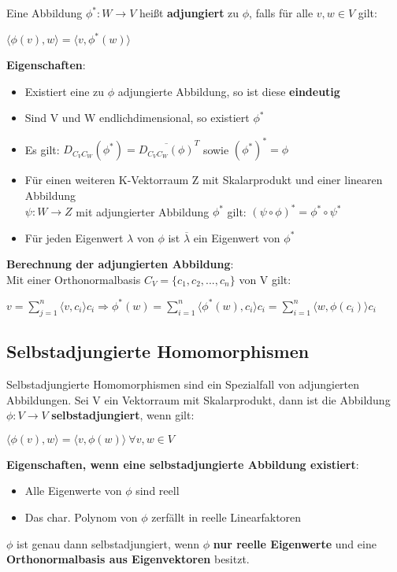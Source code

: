 \documentclass[10pt,a4paper]{article}
\begin{document}
	Eine Abbildung $\phi^*: W \rightarrow V$ heißt \textbf{adjungiert} zu $\phi$, falls für alle $v, w \in V$ gilt:
	\begin{center}
		$\langle \phi(v), w\rangle = \langle v, \phi^*(w)\rangle$
	\end{center}
	\textbf{Eigenschaften}:
	\begin{itemize}
		\item Existiert eine zu $\phi$ adjungierte Abbildung, so ist diese \textbf{eindeutig}
		\item Sind V und W endlichdimensional, so existiert $\phi^*$
		\item Es gilt: $D_{C_VC_W}(\phi^*) = \overline{D_{C_VC_W}(\phi)}^T$ sowie $(\phi^*)^* = \phi$
		\item Für einen weiteren K-Vektorraum Z mit Skalarprodukt und einer linearen Abbildung\\ $\psi: W \rightarrow Z$ mit adjungierter Abbildung $\phi^*$ gilt: $(\psi \circ \phi)^* = \phi^* \circ \psi^*$
		\item Für jeden Eigenwert $\lambda$ von $\phi$ ist $\overline{\lambda}$ ein Eigenwert von $\phi^*$
	\end{itemize}
	\textbf{Berechnung der adjungierten Abbildung}:\\
	Mit einer Orthonormalbasis $C_V = \{c_1, c_2, ..., c_n\}$ von V gilt:
	\begin{center}
		$v = \sum_{j = 1}^{n}\langle v, c_i\rangle c_i \Rightarrow \phi^*(w) = \sum_{i = 1}^{n}\langle \phi^*(w), c_i\rangle c_i = \sum_{i = 1}^{n}\langle w, \phi(c_i)\rangle c_i$
	\end{center}
	
	\subsection{Selbstadjungierte Homomorphismen}
	\label{aa:sub:selbstadjungierte_homomorphismen}

	Selbstadjungierte Homomorphismen sind ein Spezialfall von adjungierten Abbildungen. Sei V ein Vektorraum mit Skalarprodukt, dann ist die Abbildung $\phi: V \rightarrow V$ \textbf{selbstadjungiert}, wenn gilt:
	\begin{center}
		$\langle \phi(v), w\rangle = \langle v, \phi(w)\rangle\ \forall v, w\in V$
	\end{center}
	\textbf{Eigenschaften, wenn eine selbstadjungierte Abbildung existiert}:
	\begin{itemize}
		\item Alle Eigenwerte von $\phi$ sind reell
		\item Das char. Polynom von $\phi$ zerfällt in reelle Linearfaktoren
	\end{itemize}
	$\phi$ ist genau dann selbstadjungiert, wenn $\phi$ \textbf{nur reelle Eigenwerte} und eine \textbf{Orthonormalbasis aus Eigenvektoren} besitzt.
\end{document}
